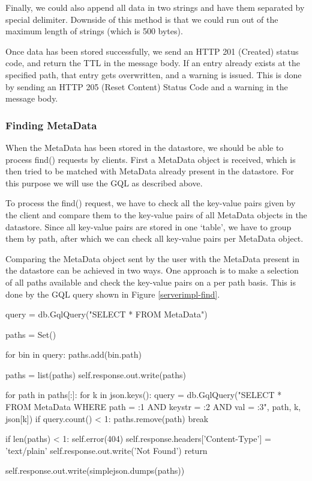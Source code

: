 Finally, we could also append all data in two strings and have them separated by
special delimiter. Downside of this method is that we could run out of the
maximum length of strings (which is 500 bytes).

Once data has been stored successfully, we send an HTTP 201 (Created) status
code, and return the TTL in the message body. If an entry already exists at the
specified path, that entry gets overwritten, and a warning is issued. This is
done by sending an HTTP 205 (Reset Content) Status Code and a warning in the
message body.


\subsubsection{Finding MetaData}
\label{serverimpl-findmd}
When the MetaData has been stored in the datastore, we should be able to process
find() requests by clients. First a MetaData object is received, which is then
tried to be matched with MetaData already present in the datastore. For this
purpose we will use the GQL as described above.

To process the find() request, we have to check all the key-value pairs given
by the client and compare them to the key-value pairs of all MetaData objects
in the datastore. Since all key-value pairs are stored in one `table', we
have to group them by path, after which we can check all key-value pairs per
MetaData object.

Comparing the MetaData object sent by the user with the MetaData present in the
datastore can be achieved in two ways. One approach is to make a selection of
all paths available and check the key-value pairs on a per path basis. This
is done by the GQL query shown in Figure \ref{serverimpl-find}.

\begin{figure*}[ht] %
\begin{center}
\begin{code}
query = db.GqlQuery("SELECT * FROM MetaData")

paths = Set()

for bin in query:
  paths.add(bin.path)
  
paths  = list(paths)
self.response.out.write(paths)

for path in paths[:]:
  for k in json.keys():
    query = db.GqlQuery("SELECT * FROM MetaData WHERE path = :1 AND keystr = :2
                         AND val = :3", path, k, json[k])
    if query.count() < 1:
      paths.remove(path)
      break

if len(paths) < 1:
  self.error(404)
  self.response.headers['Content-Type'] = 'text/plain'
  self.response.out.write('Not Found')
  return

self.response.out.write(simplejson.dumps(paths))  
\end{code}
\caption{Functionality of \texttt{find()} Function.\label{serverimpl-find}}
\end{center}
\end{figure*}

